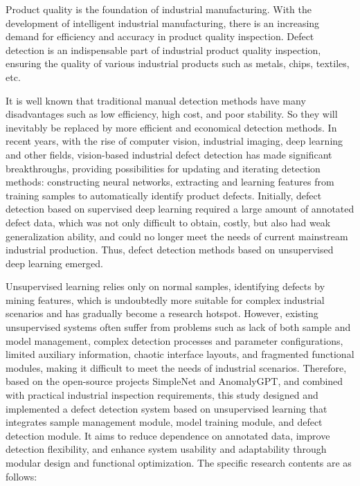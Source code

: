 \documentclass[
  ]{njuthesis}
\begin{document}
\begin{abstract*}
Product quality is the foundation of industrial manufacturing. With the development of intelligent industrial manufacturing, there is an increasing demand for efficiency and accuracy in product quality inspection. Defect detection is an indispensable part of industrial product quality inspection, ensuring the quality of various industrial products such as metals, chips, textiles, etc. 

It is well known that traditional manual detection methods have many disadvantages such as low efficiency, high cost, and poor stability. So they will inevitably be replaced by more efficient and economical detection methods. In recent years, with the rise of computer vision, industrial imaging, deep learning and other fields, vision-based industrial defect detection has made significant breakthroughs, providing possibilities for updating and iterating detection methods: constructing neural networks, extracting and learning features from training samples to automatically identify product defects. Initially, defect detection based on supervised deep learning required a large amount of annotated defect data, which was not only difficult to obtain, costly, but also had weak generalization ability, and could no longer meet the needs of current mainstream industrial production. Thus, defect detection methods based on unsupervised deep learning emerged. 

Unsupervised learning relies only on normal samples, identifying defects by mining features, which is undoubtedly more suitable for complex industrial scenarios and has gradually become a research hotspot. However, existing unsupervised systems often suffer from problems such as lack of both sample and model management, complex detection processes and parameter configurations, limited auxiliary information, chaotic interface layouts, and fragmented functional modules, making it difficult to meet the needs of industrial scenarios. Therefore, based on the open-source projects SimpleNet and AnomalyGPT, and combined with practical industrial inspection requirements, this study designed and implemented a defect detection system based on unsupervised learning that integrates sample management module, model training module, and defect detection module. It aims to reduce dependence on annotated data, improve detection flexibility, and enhance system usability and adaptability through modular design and functional optimization. The specific research contents are as follows:


\end{abstract*}
\end{document}
